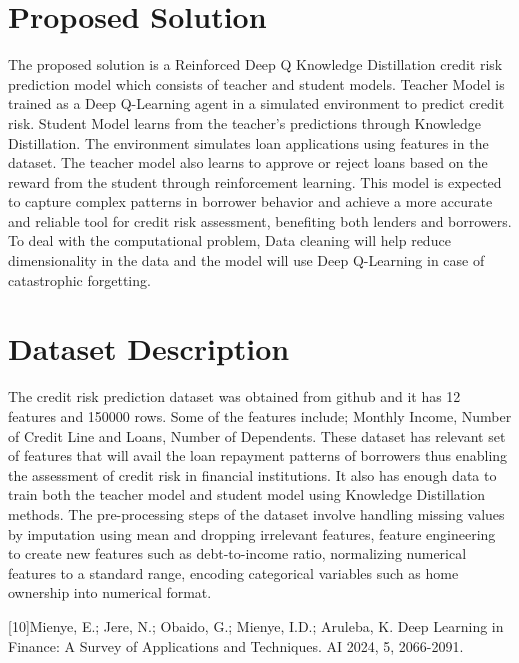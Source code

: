 \documentclass[8pt]{article}
\begin{document}
\section{Proposed Solution}
The proposed solution is a Reinforced Deep Q Knowledge Distillation credit risk prediction model which consists of teacher and student models. Teacher Model is trained as a Deep Q-Learning agent in a simulated environment to predict credit risk. Student Model learns from the teacher’s predictions through Knowledge Distillation. The environment simulates loan applications using features in the dataset. The teacher model also learns to approve or reject loans based on the reward from the student through reinforcement learning.
This model is expected to capture complex patterns in borrower behavior and achieve a more accurate and reliable tool for credit risk assessment, benefiting both lenders and borrowers. To deal with the computational problem, Data cleaning will help reduce dimensionality in the data and the model will use Deep Q-Learning in case of catastrophic forgetting.
\section{Dataset Description
}

The credit risk prediction dataset was obtained from github and it has 12 features and 150000 rows. Some of the features include; Monthly Income, Number of Credit Line and Loans, Number of Dependents. These dataset has relevant set of features that will avail the loan repayment patterns of borrowers thus enabling the assessment of credit risk in financial institutions. It also has enough data to train both the teacher model and student model using Knowledge Distillation methods.  
The pre-processing steps of the dataset involve handling missing values by imputation using mean and dropping irrelevant features, feature engineering to create new features such as debt-to-income ratio, normalizing numerical features to a standard range, encoding categorical variables such as home ownership into numerical format.



\cite{isakov2024cooperative}
\cite{article}
\cite{s25010191}
\cite{unknown}
\cite{MOSLEMI2024100605}
\cite{wu2025data}
\cite{rasti2024role}
\cite{gupta2024addressing}
\cite{JIANG2024101016}


[10]Mienye, E.; Jere, N.; Obaido, G.; Mienye, I.D.; Aruleba, K. Deep Learning in Finance: A Survey of Applications and Techniques. AI 2024, 5, 2066-2091.
\end{document}
